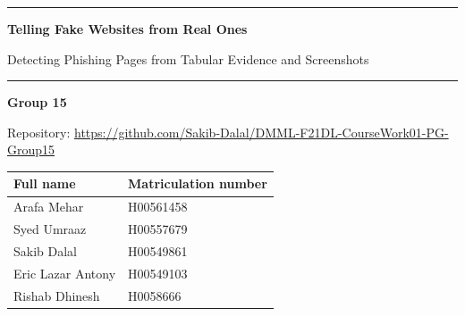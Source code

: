 \documentclass[11pt,journal,a4paper]{IEEEtran}
\begin{document}
\begin{titlepage}
\centering
\vspace*{2.6cm}

\rule{\textwidth}{1.2pt}
\vspace{0.7cm}

{\LARGE\bfseries Telling Fake Websites from Real Ones\par}
\vspace{10pt}
{\large Detecting Phishing Pages from Tabular Evidence and Screenshots\par}

\vspace{0.7cm}
\rule{\textwidth}{1.2pt}

\vspace{2.8cm}

{\large\bfseries Group 15\par}
\vspace{0.55cm}
{\normalsize Repository: \url{https://github.com/Sakib-Dalal/DMML-F21DL-CourseWork01-PG-Group15}\par}

\vspace{2.4cm}

{\renewcommand{\arraystretch}{1.5}
\begin{tabular}{ll}
\toprule
\textbf{Full name} & \textbf{Matriculation number} \\
\midrule
Arafa Mehar        & H00561458 \\
Syed Umraaz        & H00557679 \\
Sakib Dalal        & H00549861 \\
Eric Lazar Antony  & H00549103 \\
Rishab Dhinesh     & H0058666 \\
\bottomrule
\end{tabular}\par}

\vfill
\end{titlepage}

\pagestyle{plain}
\end{document}
